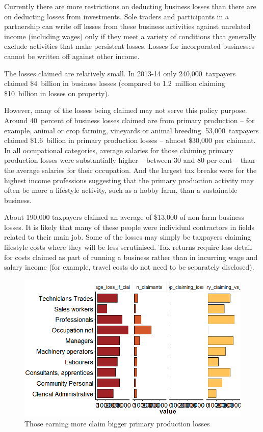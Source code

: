 \documentclass{grattan}\usepackage[]{graphicx}\usepackage[]{color}
\begin{document}
Currently there are more restrictions on deducting business losses than there are on deducting losses from investments. Sole traders and participants in a partnership can write off losses from these business activities against unrelated income (including wages) only if they meet a variety of conditions that generally exclude activities that make persistent losses.  Losses for incorporated businesses cannot be written off against other income. 





The losses claimed are relatively small. In 2013-14 only 240,000~taxpayers claimed \$4~billion in business losses (compared to 1.2~million claiming \$10~billion in losses on property).

\TBD{\dots}



However, many of the losses being claimed may not serve this policy purpose. Around 40~percent of business losses claimed are from primary production -- for example, animal or crop farming, vineyards or animal breeding. 53,000~taxpayers claimed \$1.6~billion  in primary production losses -- almost \$30,000 per claimant. In all occupational categories, average salaries for those claiming primary production losses were substantially higher -- between 30 and 80 per cent -- than the average salaries for their occupation. And the largest tax breaks were for the highest income professions  suggesting that the primary production activity may often be more a lifestyle activity, such as a hobby farm, than a sustainable business. 



About 190,000 taxpayers claimed an average of \$13,000 of non-farm business losses. It is likely that many of these people were individual contractors in fields related to their main job. Some of the losses may simply be taxpayers claiming lifestyle costs where they will be less scrutinised. Tax returns require less detail for costs claimed as part of running a business rather than in incurring wage and salary income (for example, travel costs do not need to be separately disclosed). 

\begin{figure}
\caption{Those earning more claim bigger primary production losses}

\includegraphics[width=\columnwidth]{CGT-NG-atlas//PP-losses-by-occ-1}
\end{figure}
\end{document}
